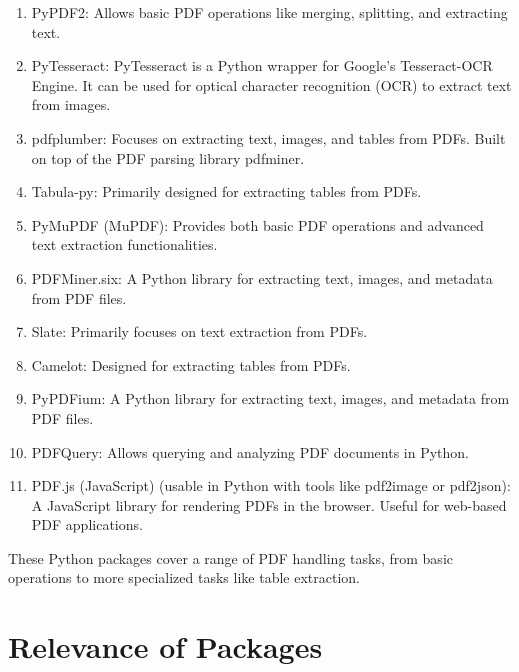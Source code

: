 \begin{enumerate}
\item PyPDF2: Allows basic PDF operations like merging, splitting, and extracting text.
\item PyTesseract: PyTesseract is a Python wrapper for Google's Tesseract-OCR Engine. It can be used for optical character recognition (OCR) to extract text from images.
\item pdfplumber: Focuses on extracting text, images, and tables from PDFs. Built on top of the PDF parsing library pdfminer.
\item Tabula-py: Primarily designed for extracting tables from PDFs.
\item PyMuPDF (MuPDF): Provides both basic PDF operations and advanced text extraction functionalities.
\item PDFMiner.six: A Python library for extracting text, images, and metadata from PDF files.
\item Slate: Primarily focuses on text extraction from PDFs.
\item Camelot: Designed for extracting tables from PDFs.
\item PyPDFium: A Python library for extracting text, images, and metadata from PDF files.
\item PDFQuery: Allows querying and analyzing PDF documents in Python.
\item PDF.js (JavaScript) (usable in Python with tools like pdf2image or pdf2json): A JavaScript library for rendering PDFs in the browser. Useful for web-based PDF applications.
\end{enumerate}

These Python packages cover a range of PDF handling tasks, from basic operations to more specialized tasks like table extraction. 


\section{Relevance of Packages}

